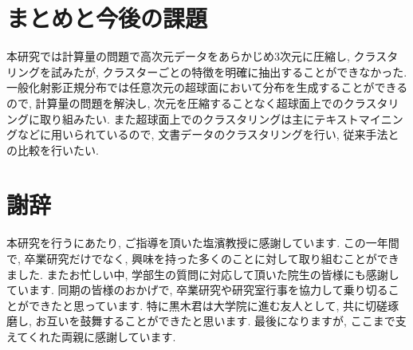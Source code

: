 \documentclass[a4j,12pt]{jarticle}
\begin{document}
\section{まとめと今後の課題}

本研究では計算量の問題で高次元データをあらかじめ$3$次元に圧縮し, クラスタリングを試みたが, クラスターごとの特徴を明確に抽出することができなかった. 一般化射影正規分布では任意次元の超球面において分布を生成することができるので, 計算量の問題を解決し, 次元を圧縮することなく超球面上でのクラスタリングに取り組みたい. また超球面上でのクラスタリングは主にテキストマイニングなどに用いられているので, 文書データのクラスタリングを行い, 従来手法との比較を行いたい. 

\section{謝辞}

本研究を行うにあたり, ご指導を頂いた塩濱教授に感謝しています. この一年間で, 卒業研究だけでなく, 興味を持った多くのことに対して取り組むことができました. またお忙しい中, 学部生の質問に対応して頂いた院生の皆様にも感謝しています. 同期の皆様のおかげで, 卒業研究や研究室行事を協力して乗り切ることができたと思っています. 特に黒木君は大学院に進む友人として, 共に切磋琢磨し, お互いを鼓舞することができたと思います. 最後になりますが, ここまで支えてくれた両親に感謝しています.

\newpage
{} %

%


\end{document}
